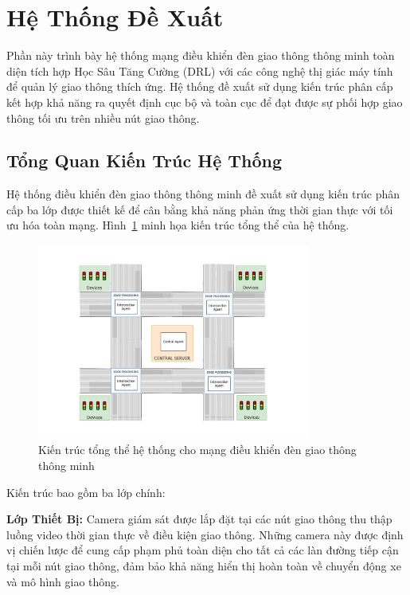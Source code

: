 \section{Hệ Thống Đề Xuất}\label{sec2a}

Phần này trình bày hệ thống mạng điều khiển đèn giao thông thông minh toàn diện tích hợp 
Học Sâu Tăng Cường (DRL) với các công nghệ thị giác máy tính để quản lý giao thông thích ứng. 
Hệ thống đề xuất sử dụng kiến trúc phân cấp kết hợp khả năng ra quyết định cục bộ và toàn cục 
để đạt được sự phối hợp giao thông tối ưu trên nhiều nút giao thông.

\subsection{Tổng Quan Kiến Trúc Hệ Thống}\label{subsec2a-1}

Hệ thống điều khiển đèn giao thông thông minh đề xuất sử dụng kiến trúc phân cấp ba lớp được 
thiết kế để cân bằng khả năng phản ứng thời gian thực với tối ưu hóa toàn mạng. 
Hình~\ref{fig:system_overview} minh họa kiến trúc tổng thể của hệ thống.

\begin{figure}[!htb]
    \centering
    \includegraphics[width=0.8\textwidth]{figures/ch3_system_overview_architecture.png}
    \caption{Kiến trúc tổng thể hệ thống cho mạng điều khiển đèn giao thông thông minh}
    \label{fig:system_overview}
\end{figure}

Kiến trúc bao gồm ba lớp chính:

\textbf{Lớp Thiết Bị:} Camera giám sát được lắp đặt tại các nút giao thông thu thập luồng video 
thời gian thực về điều kiện giao thông. Những camera này được định vị chiến lược để cung cấp 
phạm phủ toàn diện cho tất cả các làn đường tiếp cận tại mỗi nút giao thông, đảm bảo khả năng 
hiển thị hoàn toàn về chuyển động xe và mô hình giao thông.

